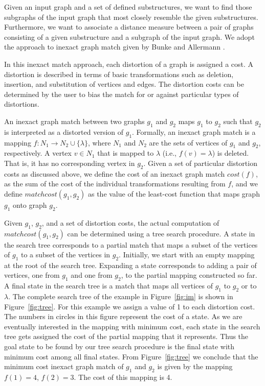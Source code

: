 Given an input graph and a set of defined substructures, we want to find
those subgraphs of the input graph that most closely resemble the given
substructures.  Furthermore, we want to associate a distance measure between a
pair of graphs consisting of a given substructure and a subgraph of the input
graph.  We adopt the approach to inexact graph match given by
Bunke and Allermann \cite{BA83}.

In this inexact match approach, each distortion of a graph is assigned a
cost.  A distortion is described in terms of basic transformations such as
deletion, insertion, and substitution of vertices and edges.  The distortion
costs can be determined by the user to bias the match for or against particular
types of distortions.

An inexact graph match between two graphs $g_1$ and $g_2$ maps $g_1$ to $g_2$
such that $g_2$ is interpreted as a distorted version of $g_1$.  Formally,
an inexact graph match is a mapping $f: N_1 \rightarrow N_2 \cup \{\lambda\}$,
where $N_1$ and $N_2$ are the sets of vertices of $g_1$ and $g_2$,
respectively.  A vertex \(v \in N_1\) that is mapped to $\lambda$ (i.e.,
$f(v) = \lambda$) is deleted.  That is, it has no corresponding vertex in
$g_2$.  Given a set of particular distortion costs as discussed above, we
define the cost of an inexact graph match \(cost(f)\), as the sum of the cost
of the individual transformations resulting from $f$, and we define
\(matchcost(g_1, g_2)\) as the value of the least-cost function that maps graph
$g_1$ onto graph $g_2$.


Given $g_1$, $g_2$, and a set of distortion costs, the actual computation
of \(matchcost(g_1, g_2)\)
can be determined using a tree search procedure.  A state in the
search tree corresponds to a partial match that maps a subset of the vertices
of $g_1$ to a subset of the vertices in $g_2$.  Initially, we start with an
empty mapping at the root of the search tree.  Expanding a state
corresponds to adding a pair of vertices, one from $g_1$ and one from $g_2$,
to the partial mapping constructed so far.  A final state in the search
tree is a match that maps all vertices of $g_1$ to $g_2$ or to $\lambda$.  The
complete search tree of the example in Figure~\ref{fig:im} is shown in
Figure~\ref{fig:tree}.  For this example we assign a value of 1 to each
distortion cost.  The numbers in circles in this figure represent the
cost of a state.  As we are eventually interested in the mapping with
minimum cost, each state in the search tree gets assigned the cost of the
partial mapping that it represents.  Thus the goal state to be found by our
tree search procedure is the final state with minimum cost among all final
states.  From Figure~\ref{fig:tree} we conclude that the minimum cost inexact
graph match of $g_1$ and $g_2$ is given by the mapping $f(1) = 4$, $f(2) =
3$.  The cost of this mapping is 4.

